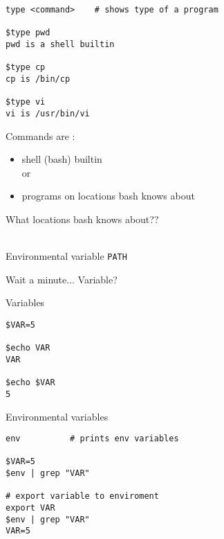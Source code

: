 \documentclass[xcolor=dvipsnames]{beamer}
\begin{document}
\begin{frame}[fragile]
\large
\begin{verbatim}
type <command>    # shows type of a program

$type pwd
pwd is a shell builtin

$type cp
cp is /bin/cp

$type vi
vi is /usr/bin/vi
\end{verbatim}
\end{frame}

\begin{frame}
	\LARGE
	Commands are :
	\begin{itemize}
		\item shell (bash) builtin \\ \large or
		\LARGE
		\item programs on locations bash knows about
	\end{itemize}
\end{frame}

\begin{frame}[fragile]
	\begin{center}
		\Huge
		What locations bash knows about?? \\
	\end{center}
	~\\
	\LARGE
	Environmental variable \verb!PATH!
\end{frame}

\begin{frame}[fragile]
	\begin{center}
		\Huge
		Wait a minute... Variable?
	\end{center}
\end{frame}

\begin{frame}[fragile]
	\begin{center}
		\Huge
		Variables
	\end{center}
\huge
\begin{verbatim}
$VAR=5

$echo VAR
VAR

$echo $VAR
5
\end{verbatim}
\end{frame}

\begin{frame}[fragile]
	\begin{center}
		\huge
		Environmental variables \\
	\end{center}

\Large
\begin{Verbatim}
env          # prints env variables

$VAR=5
$env | grep "VAR"

# export variable to enviroment
export VAR
$env | grep "VAR"
VAR=5
\end{Verbatim}
\end{frame}
\end{document}

